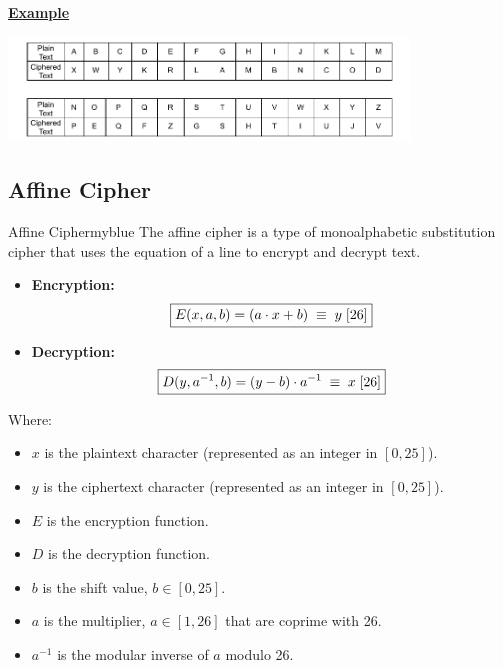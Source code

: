 \vspace{1cm}

\textbf{\underline{Example}}

\vspace{0.5cm}

\begin{center}
    \includegraphics[width=0.8\textwidth]{Chapters/Diagram/Crypto/rc.drawio.pdf}
\end{center}



\subsection{Affine Cipher}
\begin{prettyBox}{Affine Cipher}{myblue}
The affine cipher is a type of monoalphabetic substitution cipher that uses the equation of a line to encrypt and decrypt text.

\begin{itemize}
    \item \textbf{Encryption:}  
        \[\boxed{ E(x, a, b) = (a \cdot x + b) \hspace{0.1cm} \equiv \hspace{0.1cm} y \hspace{0.1cm} [26] }\]
    \item \textbf{Decryption:}  
        \[\boxed{ D(y, a^{-1}, b) = (y - b) \cdot a^{-1}\hspace{0.1cm} \equiv \hspace{0.1cm} x  \hspace{0.1cm} [26] }\]
\end{itemize}

Where:
\begin{itemize}
    \item \(x\) is the plaintext character (represented as an integer in \([0, 25]\)).
    \item \(y\) is the ciphertext character (represented as an integer in \([0, 25]\)).
    \item \(E\) is the encryption function.
    \item \(D\) is the decryption function.
    \item \(b\) is the shift value, \(b \in [0, 25]\).
\item \(a\) is the multiplier, \(a \in [1,26] \) that are coprime with 26.
    \item \(a^{-1}\) is the modular inverse of \(a\) modulo 26.
\end{itemize}
\end{prettyBox}

